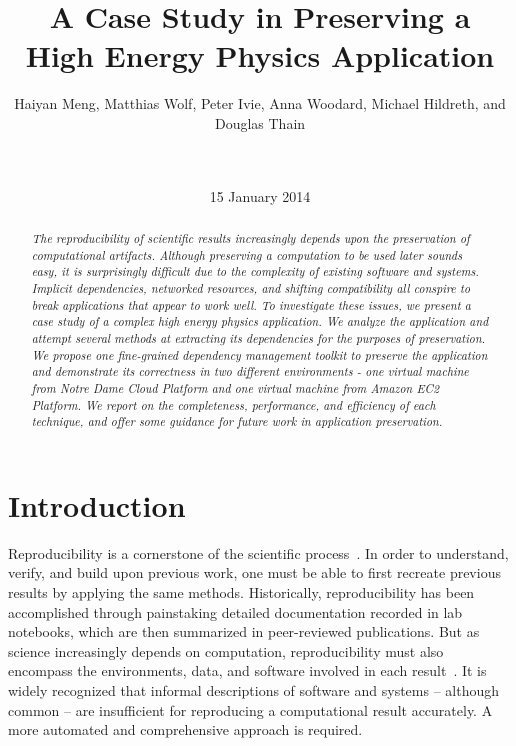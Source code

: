 \documentclass{sig-alternate}
\begin{document}
\title{A Case Study in Preserving a\\High Energy Physics Application}
\author{
Haiyan Meng, Matthias Wolf, Peter Ivie, Anna Woodard, Michael Hildreth, and Douglas Thain\\
\\
\\
}
\date{15 January 2014}
\maketitle

\begin{abstract}
\it The reproducibility of scientific results increasingly
depends upon the preservation of computational artifacts.
Although preserving a computation to be used later sounds
easy, it is surprisingly difficult due to the complexity
of existing software and systems.  Implicit dependencies,
networked resources, and shifting compatibility all conspire
to break applications that appear to work well.  To investigate
these issues, we present a case study of a complex high energy
physics application.  We analyze the application and attempt
several methods at extracting its dependencies for the purposes
of preservation. 
We propose one fine-grained dependency management toolkit to preserve the application and demonstrate its correctness in two different environments - one virtual machine from Notre Dame Cloud Platform and one virtual machine from Amazon EC2 Platform. 
We report on the completeness, performance,
and efficiency of each technique, and offer some guidance for
future work in application preservation.
\end{abstract}



\section{Introduction}

Reproducibility is a cornerstone of the scientific process~\cite{borgman2012data}.
In order to understand, verify, and build upon previous work,
one must be able to first recreate previous results by applying
the same methods. Historically, reproducibility has been
accomplished through painstaking detailed documentation recorded
in lab notebooks, which are then summarized in peer-reviewed publications.
But as science increasingly depends on computation,
reproducibility must also encompass the environments, data, and software
involved in each result~\cite{zabolitzky2002preserving}. It is widely recognized that informal
descriptions of software and systems -- although common -- are insufficient
for reproducing a computational result accurately.
A more automated and comprehensive approach is required.
\end{document}
